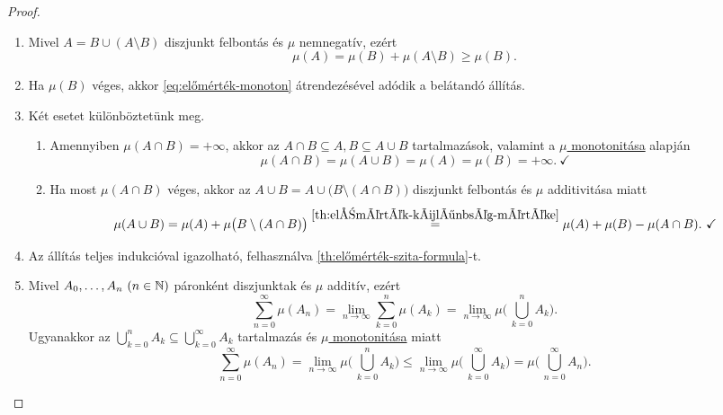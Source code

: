 \documentclass[
]{elteikthesis}[2024/04/26]
\begin{document}
	\begin{proof}\,
		\begin{enumerate}
			\item Mivel \( A = B \cup (A \setminus B) \) diszjunkt felbontás és \( \mu \) nemnegatív, ezért
			\[
				\mu(A) = \mu(B) + \mu(A \setminus B) \geq \mu(B). 
				\tag{\( * \)}\label{eq:előmérték-monoton}
			\]
			
			\item Ha \( \mu(B) \) véges, akkor \eqref{eq:előmérték-monoton} átrendezésével adódik a belátandó állítás.
			
			\item Két esetet különböztetünk meg.
			\begin{enumerate}
				\item Amennyiben \( \mu(A \cap B) = +\infty \), 
				akkor az \( A \cap B \subseteq A, B \subseteq A \cup B \) tartalmazások,
				valamint a \hyperref[th:előmérték-monoton]{\( \mu \) monotonitása} alapján
				\[
					\mu(A \cap B) = \mu(A \cup B) = \mu(A) = \mu(B) = +\infty.\ \checkmark
				\]
				
				\item Ha most \( \mu(A \cap B) \) véges, 
				akkor az \( A \cup B = A \cup \bigl( B \setminus (A \cap B) \bigr) \) diszjunkt felbontás és \( \mu \) additivitása miatt
				\[
					\mu(A \cup B) = 
					\mu(A) + \mu \bigl( B \setminus (A \cap B) \bigr) \overset{\ref{th:előmérték-különbség-mértéke}}{=} 
					\mu(A) + \mu(B) - \mu( A \cap B).\ \checkmark
				\]
			\end{enumerate}
			
			\item Az állítás teljes indukcióval igazolható, 
			felhasználva \ref{th:előmérték-szita-formula}-t.
			
			\item Mivel \( A_0, \dots, A_n \ (n \in \mathbb{N}) \) páronként diszjunktak 
			és \( \mu \) additív, ezért
			\[
				\sum_{n=0}^{\infty} \mu( A_n ) =
				\lim_{n \to \infty} \sum_{k=0}^{n} \mu( A_k ) =
				\lim_{n \to \infty} \mu \Biggl( \, \bigcup_{k=0}^n \! A_k \Biggr).
			\]
			Ugyanakkor az
			\( \bigcup\limits_{k=0}^n \! A_k \subseteq \bigcup\limits_{k=0}^{\infty} \! A_k \)
			tartalmazás és \hyperref[th:előmérték-monoton]{\( \mu \) monotonitása} miatt
			\[
				\sum_{n=0}^{\infty} \mu( A_n ) =
				\lim_{n \to \infty} \mu \Biggl( \, \bigcup_{k=0}^n \! A_k \Biggr) \leq
				\lim_{n \to \infty} \mu \Biggl( \, \bigcup_{k=0}^{\infty} \! A_k \Biggr) =
				\mu \Biggl( \, \bigcup_{n=0}^{\infty} \! A_n \Biggr).
			\]
		\end{enumerate}
	\end{proof}
	
\end{document}
